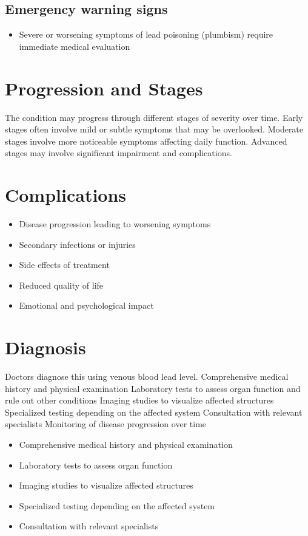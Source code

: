 \subsection{Emergency warning signs}
\begin{itemize}[noitemsep]
  \item Severe or worsening symptoms of lead poisoning (plumbism) require immediate medical evaluation
\end{itemize}
\section{Progression and Stages}
The condition may progress through different stages of severity over time. Early stages often involve mild or subtle symptoms that may be overlooked. Moderate stages involve more noticeable symptoms affecting daily function. Advanced stages may involve significant impairment and complications.
\section{Complications}
\begin{itemize}[noitemsep]
  \item Disease progression leading to worsening symptoms
  \item Secondary infections or injuries
  \item Side effects of treatment
  \item Reduced quality of life
  \item Emotional and psychological impact
\end{itemize}
\section{Diagnosis}
Doctors diagnose this using venous blood lead level. Comprehensive medical history and physical examination Laboratory tests to assess organ function and rule out other conditions Imaging studies to visualize affected structures Specialized testing depending on the affected system Consultation with relevant specialists Monitoring of disease progression over time

\begin{itemize}[noitemsep]
  \item Comprehensive medical history and physical examination
  \item Laboratory tests to assess organ function
  \item Imaging studies to visualize affected structures
  \item Specialized testing depending on the affected system
  \item Consultation with relevant specialists
\end{itemize}

